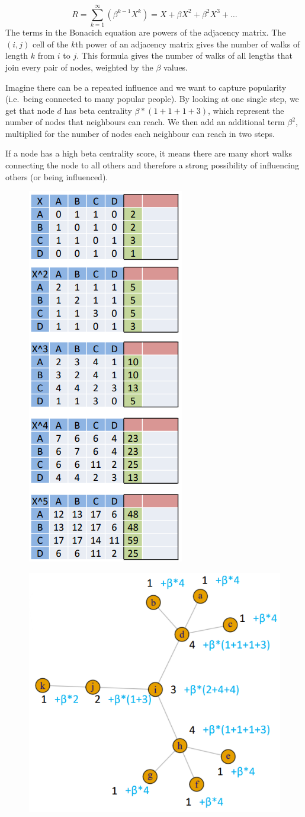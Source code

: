 \documentclass[
  notitlepage,
  onecolumn,
  openany]{book}
\begin{document}
\[
R = \sum^\infty_{k=1}(\beta^{k-1}X^k) = X+\beta X^2+\beta^2 X^3+\dots
\]
The terms in the Bonacich equation are powers of the adjacency matrix. The \((i,j)\) cell of the \(k\)th power of an adjacency matrix gives the number of walks of length \(k\) from \(i\) to \(j\). This formula gives the number of walks of all lengths that join every pair of nodes, weighted by the \(\beta\) values.

Imagine there can be a repeated influence and we want to capture popularity (i.e.~being connected to many popular people). By looking at one single step, we get that node \(d\) has beta centrality \(\beta*(1+1+1+3)\), which represent the number of nodes that neighbours can reach. We then add an additional term \(\beta^2\), multiplied for the number of nodes each neighbour can reach in two steps.

If a node has a high beta centrality score, it means there are many short walks connecting the node to all others and therefore a strong possibility of influencing others (or being influenced).

\begin{figure}[h!]

{\centering \includegraphics[width=0.3\linewidth]{images/05-Matrices and Beta centrality/Untitled 4} 

}

\end{figure}

\begin{figure}[h!]

{\centering \includegraphics[width=0.3\linewidth]{images/05-Matrices and Beta centrality/Untitled 5} 

}

\end{figure}
\end{document}
